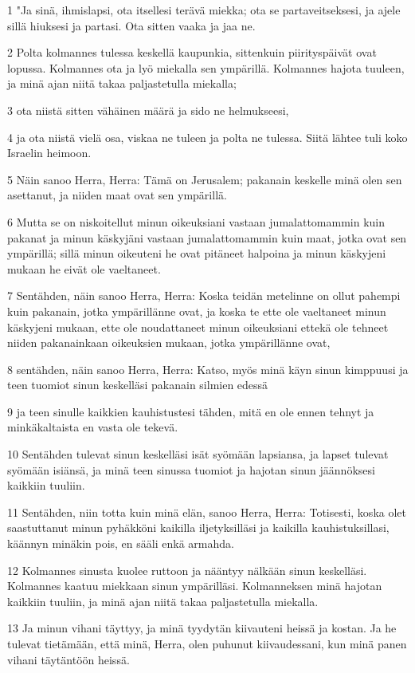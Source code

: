 \par 1 "Ja sinä, ihmislapsi, ota itsellesi terävä miekka; ota se partaveitseksesi, ja ajele sillä hiuksesi ja partasi. Ota sitten vaaka ja jaa ne.
\par 2 Polta kolmannes tulessa keskellä kaupunkia, sittenkuin piirityspäivät ovat lopussa. Kolmannes ota ja lyö miekalla sen ympärillä. Kolmannes hajota tuuleen, ja minä ajan niitä takaa paljastetulla miekalla;
\par 3 ota niistä sitten vähäinen määrä ja sido ne helmukseesi,
\par 4 ja ota niistä vielä osa, viskaa ne tuleen ja polta ne tulessa. Siitä lähtee tuli koko Israelin heimoon.
\par 5 Näin sanoo Herra, Herra: Tämä on Jerusalem; pakanain keskelle minä olen sen asettanut, ja niiden maat ovat sen ympärillä.
\par 6 Mutta se on niskoitellut minun oikeuksiani vastaan jumalattomammin kuin pakanat ja minun käskyjäni vastaan jumalattomammin kuin maat, jotka ovat sen ympärillä; sillä minun oikeuteni he ovat pitäneet halpoina ja minun käskyjeni mukaan he eivät ole vaeltaneet.
\par 7 Sentähden, näin sanoo Herra, Herra: Koska teidän metelinne on ollut pahempi kuin pakanain, jotka ympärillänne ovat, ja koska te ette ole vaeltaneet minun käskyjeni mukaan, ette ole noudattaneet minun oikeuksiani ettekä ole tehneet niiden pakanainkaan oikeuksien mukaan, jotka ympärillänne ovat,
\par 8 sentähden, näin sanoo Herra, Herra: Katso, myös minä käyn sinun kimppuusi ja teen tuomiot sinun keskelläsi pakanain silmien edessä
\par 9 ja teen sinulle kaikkien kauhistustesi tähden, mitä en ole ennen tehnyt ja minkäkaltaista en vasta ole tekevä.
\par 10 Sentähden tulevat sinun keskelläsi isät syömään lapsiansa, ja lapset tulevat syömään isiänsä, ja minä teen sinussa tuomiot ja hajotan sinun jäännöksesi kaikkiin tuuliin.
\par 11 Sentähden, niin totta kuin minä elän, sanoo Herra, Herra: Totisesti, koska olet saastuttanut minun pyhäkköni kaikilla iljetyksilläsi ja kaikilla kauhistuksillasi, käännyn minäkin pois, en sääli enkä armahda.
\par 12 Kolmannes sinusta kuolee ruttoon ja nääntyy nälkään sinun keskelläsi. Kolmannes kaatuu miekkaan sinun ympärilläsi. Kolmanneksen minä hajotan kaikkiin tuuliin, ja minä ajan niitä takaa paljastetulla miekalla.
\par 13 Ja minun vihani täyttyy, ja minä tyydytän kiivauteni heissä ja kostan. Ja he tulevat tietämään, että minä, Herra, olen puhunut kiivaudessani, kun minä panen vihani täytäntöön heissä.
